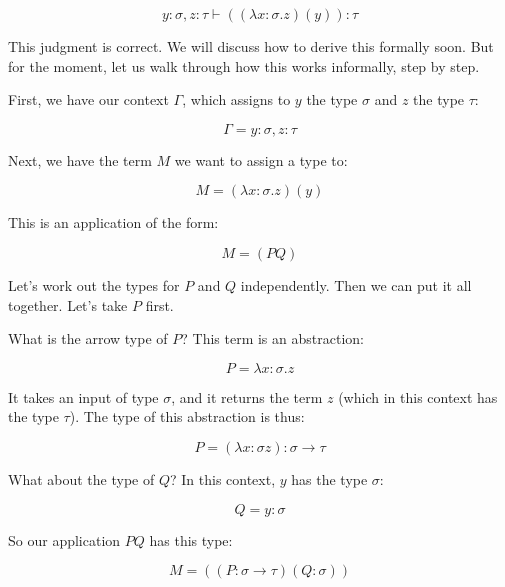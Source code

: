 \documentclass{book}
\numberwithin{equation}{chapter}
\begin{document}
\begin{equation}
y : \sigma, z : \tau \vdash ((\lambda x : \sigma.z) (y)) : \tau
\end{equation}

\noindent
This judgment is correct. We will discuss how to derive this formally soon. But for the moment, let us walk through how this works informally, step by step.

First, we have our context $\Gamma$, which assigns to $y$ the type $\sigma$ and $z$ the type $\tau$:

\begin{equation}
\Gamma = y : \sigma, z : \tau
\end{equation}

\noindent
Next, we have the term $M$ we want to assign a type to:

\begin{equation}
M = (\lambda x : \sigma.z) (y)
\end{equation}

\noindent
This is an application of the form:

\begin{equation}
M = (P Q)
\end{equation}

\noindent
Let's work out the types for $P$ and $Q$ independently. Then we can put it all together. Let's take $P$ first.

What is the arrow type of $P$? This term is an abstraction:

\begin{equation}
P = \lambda x : \sigma.z
\end{equation}

\noindent
It takes an input of type $\sigma$, and it returns the term $z$ (which in this context has the type $\tau$). The type of this abstraction is thus:

\begin{equation}
P = (\lambda x : \sigma z) : \sigma \rightarrow \tau
\end{equation}

\noindent
What about the type of $Q$? In this context, $y$ has the type $\sigma$:

\begin{equation}
Q = y : \sigma
\end{equation}

\noindent
So our application $P Q$ has this type:

\begin{equation}
M = ((P : \sigma \rightarrow \tau) (Q : \sigma))
\end{equation}
\end{document}
